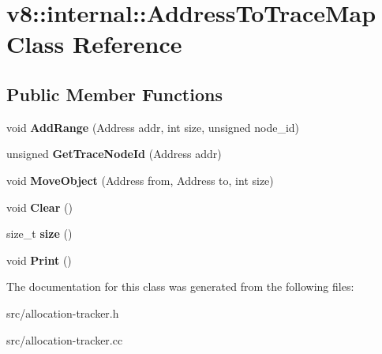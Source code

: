 \hypertarget{classv8_1_1internal_1_1_address_to_trace_map}{}\section{v8\+:\+:internal\+:\+:Address\+To\+Trace\+Map Class Reference}
\label{classv8_1_1internal_1_1_address_to_trace_map}
\subsection*{Public Member Functions}
\begin{DoxyCompactItemize}
\item 
\hypertarget{classv8_1_1internal_1_1_address_to_trace_map_a3b1bc8f1abc6f072a660d2b689852838}{}void {\bfseries Add\+Range} (Address addr, int size, unsigned node\+\_\+id)\label{classv8_1_1internal_1_1_address_to_trace_map_a3b1bc8f1abc6f072a660d2b689852838}

\item 
\hypertarget{classv8_1_1internal_1_1_address_to_trace_map_ab76fa587a105ae24f300f171d8cb22a6}{}unsigned {\bfseries Get\+Trace\+Node\+Id} (Address addr)\label{classv8_1_1internal_1_1_address_to_trace_map_ab76fa587a105ae24f300f171d8cb22a6}

\item 
\hypertarget{classv8_1_1internal_1_1_address_to_trace_map_a02c96d03b3486527aeb46a461c43cf15}{}void {\bfseries Move\+Object} (Address from, Address to, int size)\label{classv8_1_1internal_1_1_address_to_trace_map_a02c96d03b3486527aeb46a461c43cf15}

\item 
\hypertarget{classv8_1_1internal_1_1_address_to_trace_map_aa705b7b0e3c00645af20ff4d61140f02}{}void {\bfseries Clear} ()\label{classv8_1_1internal_1_1_address_to_trace_map_aa705b7b0e3c00645af20ff4d61140f02}

\item 
\hypertarget{classv8_1_1internal_1_1_address_to_trace_map_a6acf57cbb1975fe242c744f4ad5669f3}{}size\+\_\+t {\bfseries size} ()\label{classv8_1_1internal_1_1_address_to_trace_map_a6acf57cbb1975fe242c744f4ad5669f3}

\item 
\hypertarget{classv8_1_1internal_1_1_address_to_trace_map_a8aa12b1b9b85be5aba73b0631d1ea389}{}void {\bfseries Print} ()\label{classv8_1_1internal_1_1_address_to_trace_map_a8aa12b1b9b85be5aba73b0631d1ea389}

\end{DoxyCompactItemize}


The documentation for this class was generated from the following files\+:\begin{DoxyCompactItemize}
\item 
src/allocation-\/tracker.\+h\item 
src/allocation-\/tracker.\+cc\end{DoxyCompactItemize}
